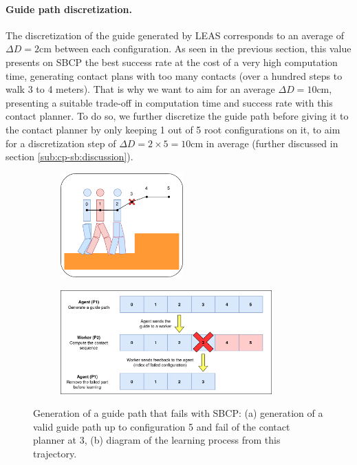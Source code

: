 \paragraph{Guide path discretization.}
The discretization of the guide generated by LEAS corresponds to an average of $\Delta D=2$cm between each configuration. 
As seen in the previous section, this value presents on SBCP the best success rate at the cost of a very high computation time, generating contact plans with too many contacts (over a hundred steps to walk 3 to 4 meters).
That is why we want to aim for an average $\Delta D=10$cm, presenting a suitable trade-off in computation time and success rate with this contact planner.
To do so, we further discretize the guide path before giving it to the contact planner by only keeping 1 out of 5 root configurations on it, to aim for a discretization step of $\Delta D = 2 \times 5 = 10$cm in average (further discussed in section \ref{sub:cp-sb:discussion}).

\begin{figure}
    \captionsetup[subfigure]{justification=centering}
    \centering
    \begin{subfigure}[t]{.35\linewidth}
    \includegraphics[width=\textwidth, height=4cm]{Figures/Chapter_CPSB/example_fail_planning.png}
    \caption{}
    \end{subfigure}
    \begin{subfigure}[t]{.60\linewidth}
    \includegraphics[width=\textwidth, height=4cm]{Figures/Chapter_CPSB/example_fail_planning_diagram.png}
    \caption{}
    \end{subfigure}
    \caption{Generation of a guide path that fails with SBCP: (a) generation of a valid guide path up to configuration 5 and fail of the contact planner at 3, (b) diagram of the learning process from this trajectory.}
    \label{fig:cp-sb:remove_fail_path}
\end{figure}

